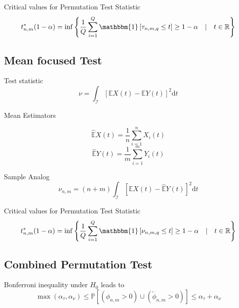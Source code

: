 \documentclass[11pt,twoside,a4paper]{article}
\theoremstyle{MAstyle} \newtheorem{assumption}{Assumption}
\theoremstyle{MAstyle} \newtheorem{definition}{Definition}
\begin{document}
			Critical values for Permutation Test Statistic
			\begin{equation}
				t^{*}_{n,m}(1-\alpha) = \inf \left\{\frac{1}{Q} \sum_{i = 1}^{Q} \mathbbm{1}\left[\tau_{n,m,q} \leq t\right] \geq 1 - \alpha \quad \vert \quad t \in \mathbb{R}\right\}
			\end{equation}
		
		\subsection{Mean focused Test}
			
			Test statistic
			\begin{equation}
				\nu = \int_{\mathcal{I}} \left[\mathbb{E}X(t) - \mathbb{E}Y(t)\right]^2 \mathrm{d}t
			\end{equation}
		
			Mean Estimators
			\begin{multicols}{2}
				\noindent
				\begin{equation}
					\hat{\mathbb{E}}X(t) = \frac{1}{n}\sum_{i = 1}^{n} X_i(t)
				\end{equation}
				\begin{equation}
					\hat{\mathbb{E}}Y(t) = \frac{1}{m}\sum_{i = 1}^{m} Y_i(t)
				\end{equation}
			\end{multicols}
			
		
			Sample Analog
			\begin{equation}
				\nu_{n,m} = (n+m) \int_{\mathcal{I}} \left[\hat{\mathbb{E}}X(t) - \hat{\mathbb{E}}Y(t)\right]^2 \mathrm{d}t
			\end{equation}
		
			Critical values for Permutation Test Statistic
			\begin{equation}
				t^{*}_{n,m}(1-\alpha) = \inf \left\{\frac{1}{Q} \sum_{i = 1}^{Q} \mathbbm{1}\left[\nu_{n,m,q} \leq t\right] \geq 1 - \alpha \quad \vert \quad t \in \mathbb{R}\right\}
			\end{equation}
		
		\subsection{Combined Permutation Test}
			Bonferroni inequality under $H_0$ leads to
			\begin{equation}
				\max(\alpha_{\tau}, \alpha_{\nu}) \leq \mathbb{P}\left[(\phi_{n,m} > 0) \cup (\tilde{\phi}_{n,m} > 0)\right] \leq \alpha_{\tau} + \alpha_{\nu}
			\end{equation}
		
\end{document}
